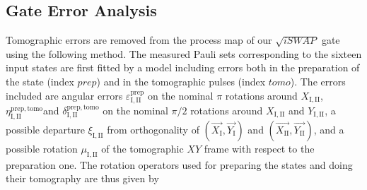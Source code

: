 \subsection{Gate Error Analysis}

Tomographic errors are removed from the process map of our $\sqrt{iSWAP}$
gate using the following method. The measured Pauli sets corresponding
to the sixteen input states are first fitted by a model including
errors both in the preparation of the state (index $prep$) and in
the tomographic pulses (index $tomo$). The errors included are angular
errors $\varepsilon_{\mathrm{I,II}}^{\mathrm{prep}}$ on the nominal
$\pi$ rotations around $X_{\mathrm{I,II}}$, $\eta_{\mathrm{I,II}}^{\mathrm{prep,tomo}}$and
$\delta_{\mathrm{I,II}}^{\mathrm{prep,tomo}}$ on the nominal $\pi/2$
rotations around $X_{\mathrm{I,II}}$ and $Y_{\mathrm{I,II}}$, a
possible departure $\xi_{\mathrm{I,II}}$ from orthogonality of $\left(\overrightarrow{X_{\mathrm{I}}},\overrightarrow{Y_{\mathrm{I}}}\right)$
and $\left(\overrightarrow{X_{\mathrm{II}}},\overrightarrow{Y_{\mathrm{II}}}\right)$,
and a possible rotation $\mu_{\mathrm{I,II}}$ of the tomographic
$XY$ frame with respect to the preparation one. The rotation operators
used for preparing the states and doing their tomography are thus
given by


